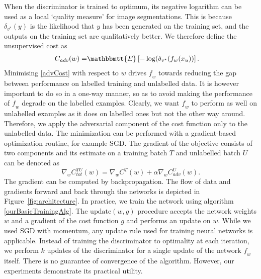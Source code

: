 \documentclass[a4paper]{article}
\newcommand{\net}{\mathit{f}} %
\newcommand{\disc}{\delta} %
\newcommand{\C}{\mathit{C}}
\newcommand{\TrainingBatch}{T}
\newcommand{\UnseenBatch}{U}
\newcommand{\reffig}[1]{Figure~\ref{#1}}
\newcommand{\expect}[1]{\mathbbmtt{E}\left[#1\right]}
\begin{document}
When the discriminator is trained to optimum, its negative logarithm can be used as a local `quality measure' for image segmentations. This is because $\disc_{v^*}(y)$ is the likelihood that $y$ has been generated on the training set, and the outputs on the training set are qualitatively better. We therefore define the unsupervised cost as
\begin{equation} \label{advCost}
  \begin{split}
    C_\mathit{adv}(w)=&\expect{-\log(\disc_{v^*}(f_w(x_u))}.
  \end{split}
\end{equation}
Minimising \eqref{advCost} with respect to $w$ drives $\net_w$ towards reducing the gap between performance on labelled training and unlabelled data. It is however important to do so in a one-way manner, so as to avoid making the performance of $\net_w$ degrade on the labelled examples. Clearly, we want $\net_w$ to perform as well on unlabelled examples as it does on labelled ones but not the other way around. Therefore, we apply the adversarial component of the cost function only to the unlabelled data.
The minimization can be performed with a gradient-based optimization routine, for example SGD. The gradient of the objective consists of two components and its estimate on a training batch $\TrainingBatch$ and unlabelled batch $\UnseenBatch$ can be denoted as
\begin{equation} \label{fullGradient}
\nabla_w \C^{\TrainingBatch\UnseenBatch}_\mathit{tot}(w) = \nabla_w \C^{\TrainingBatch}(w) + \alpha \nabla_w \C^{\UnseenBatch}_\mathit{adv}(w) .
\end{equation}
The gradient can be computed by backpropagation. 
The flow of data and gradients forward and back through the networks is depicted in \reffig{fig:architecture}.
In practice, we train the network using algorithm \ref{ourBasicTrainingAlg}. The $\mathrm{update}(w,g)$ procedure accepts the network weights $w$ and a gradient of the cost function $g$ and performs an update on $w$. While we used SGD with momentum, any update rule used for training neural networks is applicable. Instead of training the discriminator to optimality at each iteration, we perform $k$ updates of the discriminator for a single update of the network $\net_w$ itself. There is no guarantee of convergence of the algorithm. However, our experiments demonstrate its practical utility. 
\end{document}
